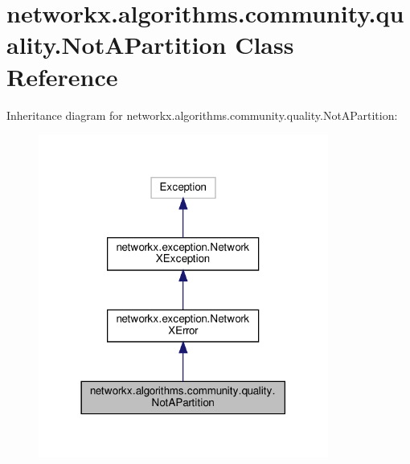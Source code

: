 \hypertarget{classnetworkx_1_1algorithms_1_1community_1_1quality_1_1NotAPartition}{}\section{networkx.\+algorithms.\+community.\+quality.\+Not\+A\+Partition Class Reference}
\label{classnetworkx_1_1algorithms_1_1community_1_1quality_1_1NotAPartition}


Inheritance diagram for networkx.\+algorithms.\+community.\+quality.\+Not\+A\+Partition\+:
\nopagebreak
\begin{figure}[H]
\begin{center}
\leavevmode
\includegraphics[width=270pt]{classnetworkx_1_1algorithms_1_1community_1_1quality_1_1NotAPartition__inherit__graph}
\end{center}
\end{figure}


